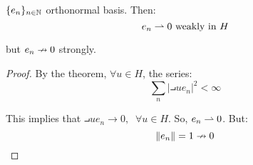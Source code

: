 \vspace{1em}

\begin{fproposition}
    $\{e_n\}_{n \in \mathbb{N}}$ orthonormal basis. Then:
    $$e_n \rightharpoonup 0 \text{ weakly in } H$$

    but $e_n \nrightarrow 0$ strongly.
\end{fproposition}

\begin{proof}
    By the theorem, $\forall u \in H$, the series:
    $$\sum_{n} |\intprod{u}{e_n}|^2 < \infty$$

    This implies that $\intprod{u}{e_n} \to 0, \;\; \forall u \in H$. So, $e_n \rightharpoonup 0$. But:
    $$\left\|e_n\right\| = 1 \nrightarrow 0$$

\end{proof}






